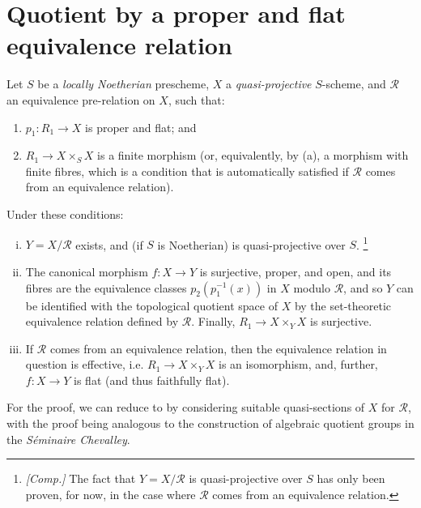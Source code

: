 \section{Quotient by a proper and flat equivalence relation}\label{fga3.iii-6}

\begin{theorem}\label{fga3.iii-6-theorem-6.1}
    Let $S$ be a \emph{locally Noetherian} prescheme, $X$ a \emph{quasi-projective} $S$-scheme, and $\mathcal{R}$ an equivalence pre-relation on $X$, such that:
    \begin{enumerate}[label=\alph*.]
        \item $p_1\colon R_1\to X$ is proper and flat; and
        \item $R_1\to X\times_S X$ is a finite morphism (or, equivalently, by (a), a morphism with finite fibres, which is a condition that is automatically satisfied if $\mathcal{R}$ comes from an equivalence relation).
    \end{enumerate}
    Under these conditions:
    \begin{enumerate}[i.]
        \item $Y=X/\mathcal{R}$ exists, and (if $S$ is Noetherian) is quasi-projective over $S$.
              \footnote{\emph{[Comp.]} The fact that $Y=X/\mathcal{R}$ is quasi-projective over $S$ has only been proven, for now, in the case where $\mathcal{R}$ comes from an equivalence relation.}
        \item The canonical morphism $f\colon X\to Y$ is surjective, proper, and open, and its fibres are the equivalence classes $p_2(p_1^{-1}(x))$ in $X$ modulo $\mathcal{R}$, and so $Y$ can be identified with the topological quotient space of $X$ by the set-theoretic equivalence relation defined by $\mathcal{R}$.
              Finally, $R_1\to X\times_Y X$ is surjective.
        \item If $\mathcal{R}$ comes from an equivalence relation, then the equivalence relation in question is effective, i.e. $R_1\to X\times_Y X$ is an isomorphism, and, further, $f\colon X\to Y$ is flat (and thus faithfully flat).
    \end{enumerate}
\end{theorem}


\begin{cproof}
    For the proof, we can reduce to  by considering suitable quasi-sections of $X$ for $\mathcal{R}$, with the proof being analogous to the construction of algebraic quotient groups in the \emph{Séminaire Chevalley}.
\end{cproof}


